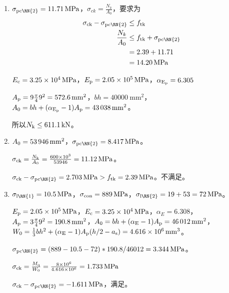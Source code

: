 \begin{enumerate}
    \item $\sigma_{\rm{pc\RN{2}}}=\SI{11.71}{\MPa}$，$\sigma_{ck}=\frac{N_k}{A_0}$，要求为
          \begin{align*}
              \sigma_{\rm{{ck}}} - \sigma_{\rm{pc\RN{2}}} & \le f_{\rm{tk}}                          \\
              \frac{N_k}{A_0}                             & \le f_{\rm{tk}} + \sigma_{\rm{pc\RN{2}}} \\
                                                          & = 2.39 + 11.71                           \\
                                                          & = \SI{14.20}{\MPa}
          \end{align*}
          \par $E_{\rm{c}}=\SI{3.25e4}{\MPa}$，$E_{\rm{p}}=\SI{2.05e5}{\MPa}$，$\alpha_{\rm{E_p}}=6.305$
          \par $A_{\rm{p}}=9\frac{\pi}{4}9^2=\SI{572.6}{\mm^2}$，$bh=\SI{40000}{\mm^2}$，$A_{\rm{0}}=bh+(\alpha_{\rm{E_p}}-1)A_{\rm{p}}=\SI{43038}{\mm^2}$。
          \par 所以$N_{\rm{k}} \le \SI{611.1}{\kN}$。
    \item \par $A_{\rm{0}}=\SI{53946}{\mm^2}$，$\sigma_{\rm{pc\RN{2}}}=\SI{8.417}{\MPa}$。
          \par $\sigma_{\rm{ck}}=\frac{N_{\rm{k}}}{A_{\rm{0}}}=\frac{\num{600e3}}{53946}=\SI{11.12}{\MPa}$。
          \par $\sigma_{\rm{ck}}-\sigma_{\rm{pc\RN{2}}}=\SI{2.703}{\MPa}>f_{\rm{tk}}=\SI{2.39}{\MPa}$。不满足。
    \item $\sigma_{\rm{l\RN{1}}}=\SI{10.5}{\MPa}$，$\sigma_{\rm{con}}=\SI{889}{\MPa}$，$\sigma_{\rm{l\RN{2}}}=19+53=\SI{72}{\MPa}$。
          \par $E_{\rm{p}}=\SI{2.05e5}{\MPa}$，$E_{\rm{c}}=\SI{3.25e4}{\MPa}$，$\alpha_E=6.308$，$A_{\rm{p}}=3\frac{\pi}{4}9^2=\SI{190.8}{\mm^2}$，$A_{\rm{0}}=bh+(\alpha_{\rm{E}}-1)A_{\rm{p}}=\SI{46012}{\mm^2}$，$W_{\rm{0}}=\frac{1}{3}bh^2+(\alpha_{\rm{E}}-1)A_{\rm{p}}(h/2-a_{\rm{s}})=\SI{4.616e6}{\mm^3}$。
          \par $\sigma_{\rm{pc\RN{2}}}=(889-10.5-72)*190.8/46012=\SI{3.344}{\MPa}$。
          \par $\sigma_{\rm{ck}}=\frac{M_{\rm{q}}}{W_{\rm{0}}}=\frac{\num{8e6}}{\num{4.616e6}}=\SI{1.733}{\MPa}$
          \par $\sigma_{\rm{ck}}-\sigma_{\rm{pc\RN{2}}}=\SI{-1.611}{\MPa}$，满足。
\end{enumerate}